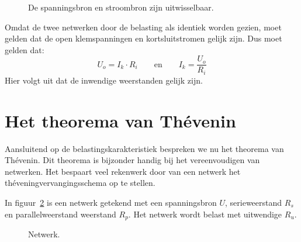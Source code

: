 \begin{figure}[!ht]
\centering
{}
\caption{De spanningsbron en stroombron zijn uitwisselbaar.}
\label{fig:gelbelspanningstroom}
\end{figure}

Omdat de twee netwerken door de belasting als identiek worden gezien, moet gelden dat de open
klemspanningen en kortsluitstromen gelijk zijn. Dus moet gelden dat:
%
\begin{equation}
U_o = I_k\cdot R_i \qquad \text{en} \qquad I_k = \dfrac{U_o}{R_i}
\end{equation}
%
Hier volgt uit dat de inwendige weerstanden gelijk zijn.

\section{Het theorema van Th\'evenin}
Aansluitend op de belastingskarakteristiek bespreken we nu het theorema van Th\'evenin.
Dit theorema is bijzonder handig bij het vereenvoudigen van netwerken. Het bespaart veel
rekenwerk door van een netwerk het th\'eveningvervangingsschema op te stellen.

In figuur~\ref{fig:geltheveninbeginschema} is een netwerk getekend met een spanningsbron $U$,
serieweerstand $R_s$ en parallelweerstand weerstand $R_p$. Het netwerk wordt belast met uitwendige $R_u$.

\begin{figure}[!ht]
\centering
{}
\caption{Netwerk.}
\label{fig:geltheveninbeginschema}
\end{figure}

